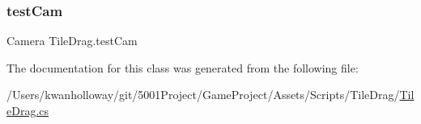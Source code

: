 \mbox{\label{class_tile_drag_ade5547217c689f6d09d444bda707d1b3}} 
\subsubsection{\texorpdfstring{test\+Cam}{testCam}}
{\footnotesize\ttfamily Camera Tile\+Drag.\+test\+Cam}



The documentation for this class was generated from the following file\+:\begin{DoxyCompactItemize}
\item 
/\+Users/kwanholloway/git/5001\+Project/\+Game\+Project/\+Assets/\+Scripts/\+Tile\+Drag/\hyperlink{_tile_drag_8cs}{Tile\+Drag.\+cs}\end{DoxyCompactItemize}
